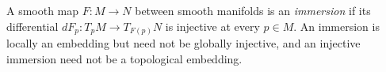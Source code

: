 
A smooth map $F:M\to N$ between smooth manifolds is an \emph{immersion} if its differential $dF_p:T_pM\to T_{F(p)}N$ is injective at every $p\in M$. An immersion is locally an embedding but need not be globally injective, and an injective immersion need not be a topological embedding.
